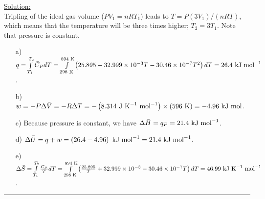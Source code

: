\noindent
\underline{Solution:}\\

Tripling of the ideal gas volume ($PV_1 = nRT_1$) leads to $T = P(3V_1) / (nRT)$, which means that the temperature will be three times higher; $T_2 = 3T_1$. Note that pressure is constant.

\begin{itemize}
\item[a)] $q = \int\limits_{T_1}^{T_2}\bar{C}_PdT = \int\limits_{298\textnormal{ K}}^{894\textnormal{ K}}\left(25.895 + 32.999\times 10^{-3}T - 30.46\times 10^{-7}T^2\right)dT = 26.4\textnormal{ kJ mol}^{-1}$.

\item[b)] $w = -P\Delta\bar{V} = -R\Delta T = -\left(8.314\textnormal{ J K}^{-1}\textnormal{ mol}^{-1}\right)\times\left(596\textnormal{ K}\right) = -4.96\textnormal{ kJ mol}$.

\item[c)] Because pressure is constant, we have $\Delta\bar{H} = q_P = 21.4\textnormal{ kJ mol}^{-1}$.

\item[d)] $\Delta\bar{U} = q + w = \left(26.4 - 4.96\right)\textnormal{ kJ mol}^{-1} = 21.4\textnormal{ kJ mol}^{-1}$.

\item[e)] $\Delta\bar{S} = \int\limits_{T_1}^{T_2}\frac{C_P}{T}dT = \int\limits_{298\textnormal{ K}}^{894\textnormal{ K}}\left(\frac{25.895}{T} + 32.999\times 10^{-3} - 30.46\times 10^{-7}T\right)dT = 46.99\textnormal{ kJ K}^{-1}\textnormal{ mol}^{-1}$.

\end{itemize}

\hrule\vspace{0.5cm}
